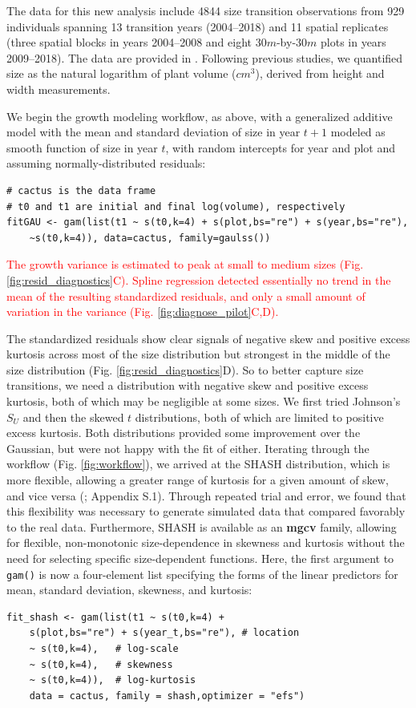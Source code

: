 \documentclass[12pt]{article}
\newcommand{\new}{\textcolor{red}}
\begin{document}
The data for this new analysis include 4844 size transition observations from 929 individuals spanning 13 transition years (2004--2018) and 11 spatial replicates (three spatial blocks in years 2004--2008 and eight $30m$-by-$30m$ plots in years 2009--2018). 
The data are provided in \cite{cactusdata}.
Following previous studies, we quantified size as the natural logarithm of plant volume ($cm^3$), derived from height and width measurements. 

We begin the growth modeling workflow, as above, with a generalized additive model with the mean and standard deviation of size in year $t+1$ modeled as smooth function of size in year $t$, with random intercepts for year and plot and assuming normally-distributed residuals:
\begin{lstlisting}
# cactus is the data frame
# t0 and t1 are initial and final log(volume), respectively
fitGAU <- gam(list(t1 ~ s(t0,k=4) + s(plot,bs="re") + s(year,bs="re"), 
	~s(t0,k=4)), data=cactus, family=gaulss())
\end{lstlisting}
\new{The growth variance is estimated to peak at small to medium sizes (Fig. \ref{fig:resid_diagnostics}C). Spline regression detected essentially no trend in the 
mean of the resulting standardized residuals, and only a small amount of variation in the variance (Fig. \ref{fig:diagnose_pilot}C,D). }  

The standardized residuals show clear signals of negative skew and positive excess kurtosis across most of the size distribution but strongest in the middle of the size distribution (Fig. \ref{fig:resid_diagnostics}D).
So to better capture size transitions, we need a distribution with negative skew and positive excess kurtosis, both of which may be negligible at some sizes.
We first tried Johnson's $S_{U}$ and then the skewed $t$ distributions, both of which are limited to positive excess kurtosis.
Both distributions provided some improvement over the Gaussian, but were not happy with the fit of either.
Iterating through the workflow (Fig. \ref{fig:workflow}), we arrived at the SHASH distribution, which is more flexible, 
allowing a greater range of kurtosis for a given amount of skew, and vice versa (\cite{jones-pewsey-2009}; Appendix S.1). 
Through repeated trial and error, we found that this flexibility was necessary to generate simulated data that compared favorably to the real data. 
Furthermore, SHASH is available as an \textbf{mgcv} family, allowing for flexible, non-monotonic size-dependence in skewness and kurtosis without the need for selecting specific size-dependent functions. 
Here, the first argument to \texttt{gam()} is now a four-element list specifying the forms of the linear predictors for mean, standard deviation, skewness, and kurtosis:
\begin{lstlisting}
fit_shash <- gam(list(t1 ~ s(t0,k=4) + 
    s(plot,bs="re") + s(year_t,bs="re"), # location 
    ~ s(t0,k=4),   # log-scale
    ~ s(t0,k=4),   # skewness
    ~ s(t0,k=4)),  # log-kurtosis
    data = cactus, family = shash,optimizer = "efs")
\end{lstlisting}
\end{document}
